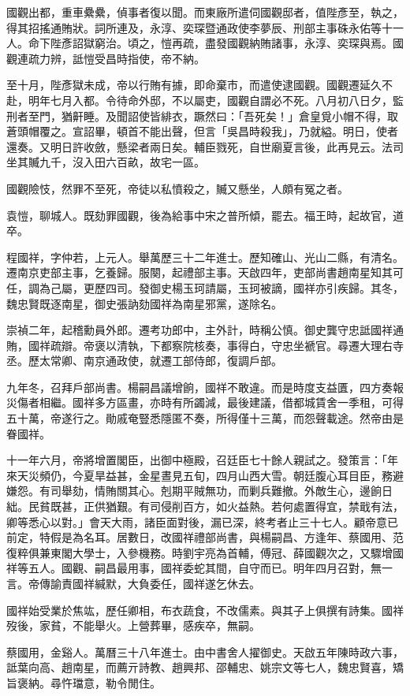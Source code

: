 \begin{pinyinscope}
國觀出都，重車纍纍，偵事者復以聞。而東廠所遣伺國觀邸者，值陛彥至，執之，得其招搖通賄狀。詞所連及，永淳、奕琛暨通政使李夢辰、刑部主事硃永佑等十一人。命下陛彥詔獄窮治。頃之，愷再疏，盡發國觀納賄諸事，永淳、奕琛與焉。國觀連疏力辨，詆愷受昌時指使，帝不納。

至十月，陛彥獄未成，帝以行賄有據，即命棄市，而遣使逮國觀。國觀遷延久不赴，明年七月入都。令待命外邸，不以屬吏，國觀自謂必不死。八月初八日夕，監刑者至門，猶鼾睡。及聞詔使皆緋衣，蹶然曰：「吾死矣！」倉皇覓小帽不得，取蒼頭帽覆之。宣詔畢，頓首不能出聲，但言「吳昌時殺我」，乃就縊。明日，使者還奏。又明日許收斂，懸梁者兩日矣。輔臣戮死，自世廟夏言後，此再見云。法司坐其贓九千，沒入田六百畝，故宅一區。

國觀險忮，然罪不至死，帝徒以私憤殺之，贓又懸坐，人頗有冤之者。

袁愷，聊城人。既劾罪國觀，後為給事中宋之普所傾，罷去。福王時，起故官，道卒。

程國祥，字仲若，上元人。舉萬歷三十二年進士。歷知確山、光山二縣，有清名。遷南京吏部主事，乞養歸。服闋，起禮部主事。天啟四年，吏部尚書趙南星知其可任，調為己屬，更歷四司。發御史楊玉珂請屬，玉珂被謫，國祥亦引疾歸。其冬，魏忠賢既逐南星，御史張訥劾國祥為南星邪黨，遂除名。

崇禎二年，起稽勳員外郎。遷考功郎中，主外計，時稱公慎。御史龔守忠詆國祥通賄，國祥疏辯。帝褒以清執，下都察院核奏，事得白，守忠坐褫官。尋遷大理右寺丞。歷太常卿、南京通政使，就遷工部侍郎，復調戶部。

九年冬，召拜戶部尚書。楊嗣昌議增餉，國祥不敢違。而是時度支益匱，四方奏報災傷者相繼。國祥多方區畫，亦時有所蠲減，最後建議，借都城賃舍一季租，可得五十萬，帝遂行之。勛戚奄豎悉隱匿不奏，所得僅十三萬，而怨聲載途。然帝由是眷國祥。

十一年六月，帝將增置閣臣，出御中極殿，召廷臣七十餘人親試之。發策言：「年來天災頻仍，今夏旱益甚，金星晝見五旬，四月山西大雪。朝廷腹心耳目臣，務避嫌怨。有司舉劾，情賄關其心。剋期平賊無功，而剿兵難撤。外敵生心，邊餉日絀。民貧既甚，正供猶艱。有司侵削百方，如火益熱。若何處置得宜，禁戢有法，卿等悉心以對。」會天大雨，諸臣面對後，漏已深，終考者止三十七人。顧帝意已前定，特假是為名耳。居數日，改國祥禮部尚書，與楊嗣昌、方逢年、蔡國用、范復粹俱兼東閣大學士，入參機務。時劉宇亮為首輔，傅冠、薛國觀次之，又驟增國祥等五人。國觀、嗣昌最用事，國祥委蛇其間，自守而已。明年四月召對，無一言。帝傳諭責國祥緘默，大負委任，國祥遂乞休去。

國祥始受業於焦竑，歷任卿相，布衣蔬食，不改儒素。與其子上俱撰有詩集。國祥歿後，家貧，不能舉火。上營葬畢，感疾卒，無嗣。

蔡國用，金谿人。萬曆三十八年進士。由中書舍人擢御史。天啟五年陳時政六事，詆葉向高、趙南星，而薦亓詩教、趙興邦、邵輔忠、姚宗文等七人，魏忠賢喜，矯旨褒納。尋忤璫意，勒令閒住。


\end{pinyinscope}
